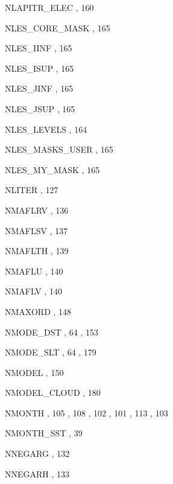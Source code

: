 \begin{theindex}
  \item NLAPITR\_ELEC
    \subitem {},  160
  \item NLES\_CORE\_MASK
    \subitem {},  165
  \item NLES\_IINF
    \subitem {},  165
  \item NLES\_ISUP
    \subitem {},  165
  \item NLES\_JINF
    \subitem {},  165
  \item NLES\_JSUP
    \subitem {},  165
  \item NLES\_LEVELS
    \subitem {},  164
  \item NLES\_MASKS\_USER
    \subitem {},  165
  \item NLES\_MY\_MASK
    \subitem {},  165
  \item NLITER
    \subitem {},  127
  \item NMAFLRV
    \subitem {},  136
  \item NMAFLSV
    \subitem {},  137
  \item NMAFLTH
    \subitem {},  139
  \item NMAFLU
    \subitem {},  140
  \item NMAFLV
    \subitem {},  140
  \item NMAXORD
    \subitem {},  148
  \item NMODE\_DST
    \subitem {},  64
    \subitem {},  153
  \item NMODE\_SLT
    \subitem {},  64
    \subitem {},  179
  \item NMODEL
    \subitem {},  150
  \item NMODEL\_CLOUD
    \subitem {},  180
  \item NMONTH
    \subitem {},  105
    \subitem {},  108
    \subitem {},  102
    \subitem {},  101
    \subitem {},  113
    \subitem {},  103
  \item NMONTH\_SST
    \subitem {},  39
  \item NNEGARG
    \subitem {},  132
  \item NNEGARH
    \subitem {},  133

\end{theindex}
